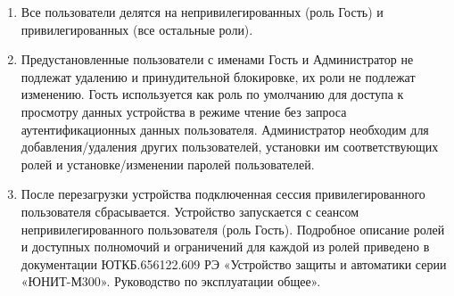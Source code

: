 \begin{enumerate}[label=\arabic{section}.\arabic{subsection}.\arabic*, labelsep=4pt, leftmargin=0pt, itemindent=57pt]
\begin{enumerate}[label=\arabic{section}.\arabic{subsection}.\arabic{enumi}.\arabic*, labelsep=4pt, leftmargin=0em, itemindent=65pt, parsep=0pt]
\item Все пользователи делятся на непривилегированных (роль Гость) и привилегированных (все остальные роли).

\item
Предустановленные пользователи с именами Гость и Администратор не подлежат удалению и принудительной блокировке, их роли не подлежат изменению. Гость используется как роль по умолчанию для доступа к просмотру данных устройства в режиме чтение без запроса аутентификационных данных пользователя. Администратор необходим для добавления/удаления других пользователей, установки им соответствующих ролей и установке/изменении паролей пользователей.
\item
После перезагрузки устройства подключенная сессия привилегированного пользователя сбрасывается. Устройство запускается с сеансом непривилегированного пользователя (роль Гость).
Подробное описание ролей и доступных полномочий и ограничений для каждой из ролей приведено в документации ЮТКБ.656122.609 РЭ «Устройство защиты и автоматики серии «ЮНИТ-М300». Руководство по эксплуатации общее».


\end{enumerate}
\end{enumerate}
